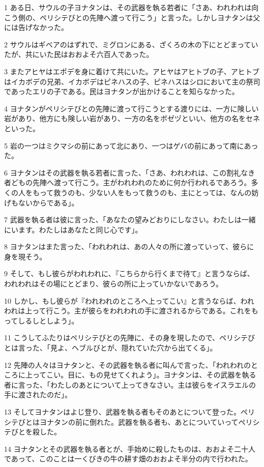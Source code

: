\par 1 ある日、サウルの子ヨナタンは、その武器を執る若者に「さあ、われわれは向こう側の、ペリシテびとの先陣へ渡って行こう」と言った。しかしヨナタンは父には告げなかった。
\par 2 サウルはギベアのはずれで、ミグロンにある、ざくろの木の下にとどまっていたが、共にいた民はおおよそ六百人であった。
\par 3 またアヒヤはエポデを身に着けて共にいた。アヒヤはアヒトブの子、アヒトブはイカボデの兄弟、イカボデはピネハスの子、ピネハスはシロにおいて主の祭司であったエリの子である。民はヨナタンが出かけることを知らなかった。
\par 4 ヨナタンがペリシテびとの先陣に渡って行こうとする渡りには、一方に険しい岩があり、他方にも険しい岩があり、一方の名をボゼヅといい、他方の名をセネといった。
\par 5 岩の一つはミクマシの前にあって北にあり、一つはゲバの前にあって南にあった。
\par 6 ヨナタンはその武器を執る若者に言った、「さあ、われわれは、この割礼なき者どもの先陣へ渡って行こう。主がわれわれのために何か行われるであろう。多くの人をもって救うのも、少ない人をもって救うのも、主にとっては、なんの妨げもないからである」。
\par 7 武器を執る者は彼に言った、「あなたの望みどおりにしなさい。わたしは一緒にいます。わたしはあなたと同じ心です」。
\par 8 ヨナタンはまた言った、「われわれは、あの人々の所に渡っていって、彼らに身を現そう。
\par 9 そして、もし彼らがわれわれに、『こちらから行くまで待て』と言うならば、われわれはその場にとどまり、彼らの所に上っていかないであろう。
\par 10 しかし、もし彼らが『われわれのところへ上ってこい』と言うならば、われわれは上って行こう。主が彼らをわれわれの手に渡されるからである。これをもってしるしとしよう」。
\par 11 こうしてふたりはペリシテびとの先陣に、その身を現したので、ペリシテびとは言った、「見よ、ヘブルびとが、隠れていた穴から出てくる」。
\par 12 先陣の人々はヨナタンと、その武器を執る者に叫んで言った、「われわれのところに上ってこい。目に、もの見せてくれよう」。ヨナタンは、その武器を執る者に言った、「わたしのあとについて上ってきなさい。主は彼らをイスラエルの手に渡されたのだ」。
\par 13 そしてヨナタンはよじ登り、武器を執る者もそのあとについて登った。ペリシテびとはヨナタンの前に倒れた。武器を執る者も、あとについていってペリシテびとを殺した。
\par 14 ヨナタンとその武器を執る者とが、手始めに殺したものは、おおよそ二十人であって、このことは一くびきの牛の耕す畑のおおよそ半分の内で行われた。
